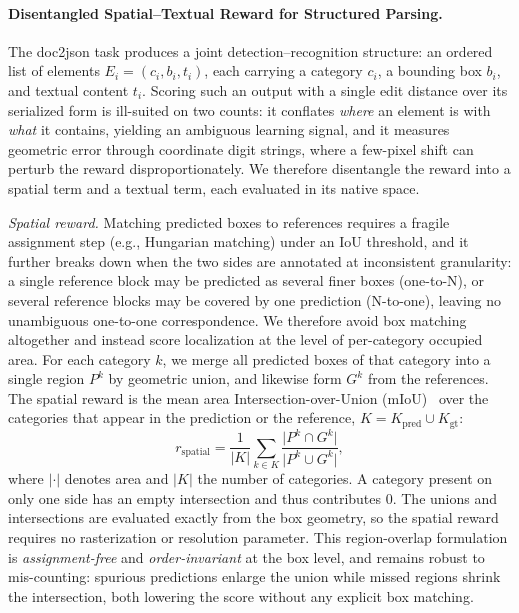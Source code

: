 \paragraph{Disentangled Spatial--Textual Reward for Structured Parsing.}
\label{sec:str}
The doc2json task produces a joint detection--recognition structure: an ordered list of elements $E_i=(c_i,b_i,t_i)$, each carrying a category $c_i$, a bounding box $b_i$, and textual content $t_i$. Scoring such an output with a single edit distance over its serialized form is ill-suited on two counts: it conflates \emph{where} an element is with \emph{what} it contains, yielding an ambiguous learning signal, and it measures geometric error through coordinate digit strings, where a few-pixel shift can perturb the reward disproportionately. We therefore disentangle the reward into a spatial term and a textual term, each evaluated in its native space.

\textit{Spatial reward.} Matching predicted boxes to references requires a fragile assignment step (e.g., Hungarian matching) under an IoU threshold, and it further breaks down when the two sides are annotated at inconsistent granularity: a single reference block may be predicted as several finer boxes (one-to-N), or several reference blocks may be covered by one prediction (N-to-one), leaving no unambiguous one-to-one correspondence. We therefore avoid box matching altogether and instead score localization at the level of per-category occupied area. For each category $k$, we merge all predicted boxes of that category into a single region $P^{k}$ by geometric union, and likewise form $G^{k}$ from the references. The spatial reward is the mean area Intersection-over-Union (mIoU)~\cite{chen2018encoder} over the categories that appear in the prediction or the reference, $K=K_{\mathrm{pred}}\cup K_{\mathrm{gt}}$:
\begin{equation}
r_{\mathrm{spatial}} = \frac{1}{\lvert K\rvert}\sum_{k\in K}\frac{\lvert P^{k}\cap G^{k}\rvert}{\lvert P^{k}\cup G^{k}\rvert},
\end{equation}
where $\lvert\cdot\rvert$ denotes area and $\lvert K\rvert$ the number of categories. A category present on only one side has an empty intersection and thus contributes $0$. The unions and intersections are evaluated exactly from the box geometry, so the spatial reward requires no rasterization or resolution parameter. This region-overlap formulation is \emph{assignment-free} and \emph{order-invariant} at the box level, and remains robust to mis-counting: spurious predictions enlarge the union while missed regions shrink the intersection, both lowering the score without any explicit box matching.

